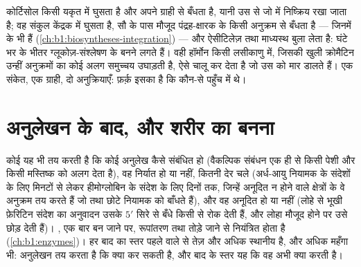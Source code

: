 \begin{example}[कोई संकेत अभिव्यक्ति का प्रतिरूप बन जाता है]\label{ex:b1:expression-control:steroid}
कोर्टिसोल किसी यकृत  में घुसता है और अपने ग्राही से बँधता है, यानी
उस  से जो  में निष्क्रिय रखा जाता है; वह संकुल
केंद्रक में घुसता है, सौ  के पास मौजूद पंद्रह-क्षारक के किसी अनुक्रम
से बँधता है --- जिनमें  के  भी हैं (\cref{ch:b1:biosyntheses-integration}) ---
और ऐसीटिलेज़ तथा माध्यस्थ बुला लेता है: घंटे भर के भीतर
ग्लूकोज़-संश्लेषण के  बनने लगते हैं। वही हॉर्मोन किसी लसीकाणु में,
जिसकी खुली क्रोमैटिन उन्हीं अनुक्रमों का कोई अलग समुच्चय उघाड़ती है,
ऐसे  चालू कर देता है जो उस  को मार डालते हैं। एक संकेत, एक
ग्राही, दो अनुक्रियाएँ: फ़र्क़ इसका है कि कौन-से  पहुँच में थे।
\end{example}

\section{अनुलेखन के बाद, और शरीर का बनना}

\begin{proposition}[उन्नायक से परे नियंत्रण]\label{prop:b1:expression-control:posttranscriptional}
कोई  यह भी तय करती है कि कोई अनुलेख कैसे संबंधित हो
(वैकल्पिक संबंधन एक ही  से किसी पेशी और किसी मस्तिष्क को अलग 
देता है), वह निर्यात हो या नहीं, कितनी देर चले (अर्ध-आयु नियामक
 के संदेशों के लिए मिनटों से लेकर हीमोग्लोबिन के संदेश के लिए
दिनों तक, जिन्हें अनूदित न होने वाले क्षेत्रों के वे अनुक्रम तय करते हैं
जो  तथा छोटे नियामक  को बाँधते हैं), और वह अनूदित हो या नहीं
(लोहे से भूखी  फ़ेरिटिन संदेश का अनुवादन उसके $5'$ सिरे से बँधे
किसी  से रोक देती हैं, और लोहा मौजूद होने पर उसे छोड़ देती हैं)।
, एक बार बन जाने पर, रूपांतरण तथा तोड़े जाने से नियंत्रित होता है
(\cref{ch:b1:enzymes})। हर बाद का स्तर पहले वाले से तेज़ और अधिक स्थानीय
है, और अधिक महँगा भी: अनुलेखन तय करता है कि  क्या कर सकती है, और
बाद के स्तर यह कि वह अभी क्या करती है।
\end{proposition}

